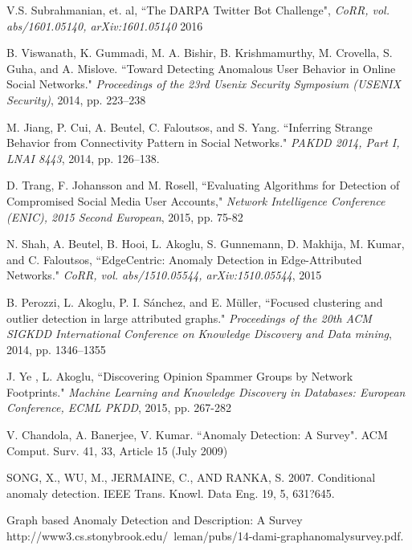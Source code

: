 \documentclass[11pt, oneside]{article}   	%
\begin{document}
\begin{thebibliography}{123}
 V.S. Subrahmanian, et. al, ``The DARPA Twitter Bot Challenge", \emph{CoRR, vol. abs/1601.05140, arXiv:1601.05140} 2016

 B. Viswanath, K. Gummadi, M. A. Bishir, B. Krishmamurthy, M. Crovella, S. Guha, and A. Mislove. ``Toward Detecting Anomalous User Behavior in Online Social Networks." \emph{Proceedings of the 23rd Usenix Security Symposium (USENIX Security)}, 2014, pp. 223--238

 M. Jiang, P. Cui, A. Beutel, C. Faloutsos, and S. Yang. ``Inferring Strange Behavior from Connectivity Pattern in Social Networks." \emph{PAKDD 2014, Part I, LNAI 8443}, 2014, pp. 126--138.

 D. Trang, F. Johansson and M. Rosell, ``Evaluating Algorithms for Detection of Compromised Social Media User Accounts," \emph{Network Intelligence Conference (ENIC), 2015 Second European}, 2015, pp. 75-82

 N. Shah, A. Beutel, B. Hooi, L. Akoglu, S. Gunnemann, D. Makhija, M. Kumar, and C. Faloutsos, ``EdgeCentric: Anomaly Detection in Edge-Attributed Networks." \emph{CoRR, vol. abs/1510.05544, arXiv:1510.05544}, 2015

 B. Perozzi, L. Akoglu, P. I. Sánchez, and E. Müller, ``Focused clustering and outlier detection in large attributed graphs." \emph{Proceedings of the 20th ACM SIGKDD International Conference on Knowledge Discovery and Data mining}, 2014, pp. 1346--1355

 J. Ye , L. Akoglu, ``Discovering Opinion Spammer Groups by Network Footprints." \emph{Machine Learning and Knowledge Discovery in Databases: European Conference, ECML PKDD}, 2015, pp. 267-282

 V. Chandola, A. Banerjee, V. Kumar. ``Anomaly Detection: A Survey". ACM Comput. Surv. 41, 33, Article 15 (July 2009)

 SONG, X., WU, M., JERMAINE, C., AND RANKA, S. 2007. Conditional anomaly detection. IEEE Trans. Knowl. Data Eng. 19, 5, 631?645.

 Graph based Anomaly Detection and Description: A Survey http://www3.cs.stonybrook.edu/~leman/pubs/14-dami-graphanomalysurvey.pdf.


\end{thebibliography}
\end{document}
